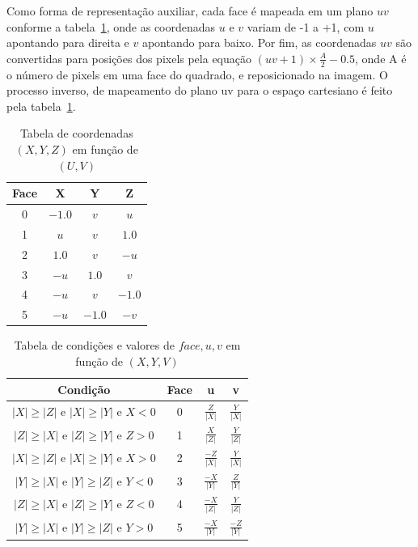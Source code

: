 Como forma de representação auxiliar, cada face é mapeada em um plano $uv$ conforme a tabela~\ref{tab:uv_erp}, onde as coordenadas $u$ e $v$ variam de -1 a +1, com $u$ apontando para direita e $v$ apontando para baixo. Por fim, as coordenadas $uv$ são convertidas para posições dos pixels pela equação $ (uv+1)\times \frac{A}{2}-0.5$, onde A é o número de pixels em uma face do quadrado, e reposicionado na imagem. O processo inverso, de mapeamento do plano uv para o espaço cartesiano é feito pela tabela~\ref{tab:uv_erp}.

\begin{table}[htbp]
    \centering
    \caption{Tabela de coordenadas $(X, Y, Z)$ em função de $(U, V)$}
    \label{tab:uv_erp}
    \begin{tabular}{|c|c|c|c|}
    \hline
    \textbf{Face} & \textbf{X} & \textbf{Y} & \textbf{Z} \\
    \hline
    0 & $-1.0$ & $v$    & $u$    \\
    1 & $u$    & $v$    & $1.0$  \\
    2 & $1.0$  & $v$    & $-u$   \\
    3 & $-u$   & $1.0$  & $v$    \\
    4 & $-u$   & $v$    & $-1.0$ \\
    5 & $-u$   & $-1.0$ & $-v$   \\
    \hline
    \end{tabular}
\end{table}

\begin{table}[htbp]
    \centering
    \caption{Tabela de condições e valores de \( face, u, v \) em função de $(X, Y, V)$}
    \label{tab:condicoes}
    \begin{tabular}{|c|c|c|c|}
    \hline
    \textbf{Condição} & \textbf{Face} & \textbf{u} & \textbf{v} \\
    \hline
    $ |X| \geq |Z|  \text{ e }  |X| \geq |Y|  \text{ e }  X < 0 $ & 0 &  $\frac{Z}{|X|}$ & $ \frac{Y}{|X|} $ \\
    $ |Z| \geq |X|  \text{ e }  |Z| \geq |Y|  \text{ e }  Z > 0 $ & 1 &  $\frac{X}{|Z|}$ & $ \frac{Y}{|Z|} $ \\
    $ |X| \geq |Z|  \text{ e }  |X| \geq |Y|  \text{ e }  X > 0 $ & 2 &  $\frac{-Z}{|X|}$  & $ \frac{Y}{|X|} $ \\
    $ |Y| \geq |X|  \text{ e }  |Y| \geq |Z|  \text{ e }  Y < 0 $ & 3 &  $\frac{-X}{|Y|} $ & $ \frac{Z}{|Y|} $ \\
    $ |Z| \geq |X|  \text{ e }  |Z| \geq |Y|  \text{ e }  Z < 0 $ & 4 &  $\frac{-X}{|Z|}$  & $ \frac{Y}{|Z|} $ \\
    $ |Y| \geq |X|  \text{ e }  |Y| \geq |Z|  \text{ e }  Y > 0 $ & 5 &  $\frac{-X}{|Y|}$  & $ \frac{-Z}{|Y|} $ \\
    \hline
    \end{tabular}
\end{table}

